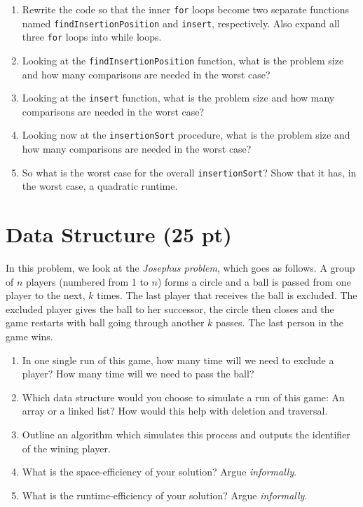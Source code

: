 \documentclass[11pt]{article}
\begin{document}
\begin{enumerate}
\item Rewrite the code so that the inner \texttt{for} loops become two separate
functions named \texttt{findInsertionPosition} and \texttt{insert},
respectively. Also expand all three \texttt{for} loops into while loops.

\item Looking at the \texttt{findInsertionPosition} function, what is the
problem size and how many comparisons are needed in the worst
case?

\item Looking at the \texttt{insert} function, what is the problem size and how
many comparisons are needed in the worst case?

\item Looking now at the \texttt{insertionSort} procedure, what is the
problem size and how many comparisons are needed in the worst
case?

\item So what is the worst case for the overall \texttt{insertionSort}? Show
that it has, in the worst case, a quadratic runtime.
\end{enumerate}

\section{Data Structure (25 pt)}
\label{sec:org1ad97de}

In this problem, we look at the \emph{Josephus problem}, which goes as
follows. A group of \(n\) players (numbered from 1 to \(n\)) forms a
circle and a ball is passed from one player to the next, \(k\)
times. The last player that receives the ball is excluded. The
excluded player gives the ball to her successor, the circle then
closes and the game restarts
with ball going through another \(k\)
passes. The last person in the game wins.

\begin{enumerate}
\item In one single run of this game, how many time will we need to
exclude a player? How many time will we need to pass the ball?

\item Which data structure would you choose to simulate a run of this
game: An array or a linked list? How would this help with
deletion and traversal.

\item Outline an algorithm which simulates this process and outputs the
identifier of the wining player.

\item What is the space-efficiency of your solution? Argue \emph{informally}.

\item What is the runtime-efficiency of your solution? Argue
\emph{informally}.
\end{enumerate}
\end{document}

